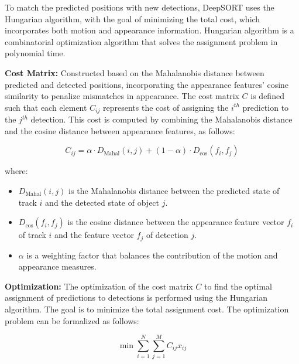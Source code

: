 \documentclass[12pt, letterpaper]{article}
\begin{document}
{\begin{spacing}{1.2}

To match the predicted positions with new detections, DeepSORT uses the Hungarian algorithm, with the goal of minimizing the total cost, which incorporates both motion and appearance information. Hungarian algorithm is a combinatorial optimization algorithm that solves the assignment problem in polynomial time.

\textbf{Cost Matrix:} Constructed based on the Mahalanobis distance between predicted and detected positions, incorporating the appearance features' cosine similarity to penalize mismatches in appearance. The cost matrix \(C\) is defined such that each element \(C_{ij}\) represents the cost of assigning the \(i^{th}\) prediction to the \(j^{th}\) detection. This cost is computed by combining the Mahalanobis distance and the cosine distance between appearance features, as follows:

\[
C_{ij} = \alpha \cdot D_{\text{Mahal}}(i, j) + (1 - \alpha) \cdot D_{\text{cos}}(f_i, f_j)
\]

where:
\begin{itemize}
    \item \(D_{\text{Mahal}}(i, j)\) is the Mahalanobis distance between the predicted state of track \(i\) and the detected state of object \(j\).
    \item \(D_{\text{cos}}(f_i, f_j)\) is the cosine distance between the appearance feature vector \(f_i\) of track \(i\) and the feature vector \(f_j\) of detection \(j\).
    \item \(\alpha\) is a weighting factor that balances the contribution of the motion and appearance measures.
\end{itemize}


\textbf{Optimization:} The optimization of the cost matrix \(C\) to find the optimal assignment of predictions to detections is performed using the Hungarian algorithm. The goal is to minimize the total assignment cost. The optimization problem can be formalized as follows:

\[
\min \sum_{i=1}^{N} \sum_{j=1}^{M} C_{ij} x_{ij}
\]


\end{spacing}}
\end{document}
